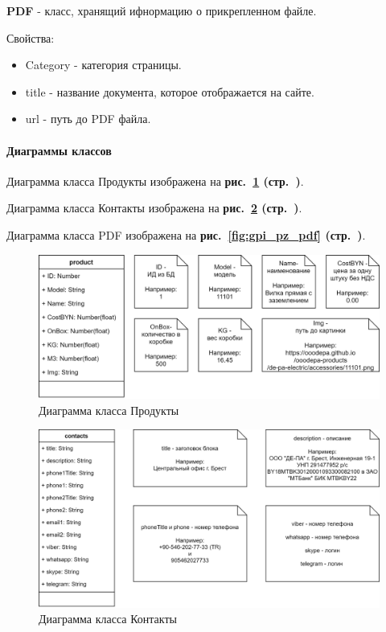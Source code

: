 \textbf{PDF} - класс, хранящий ифнормацию о прикрепленном файле.

Свойства:
\begin{itemize}
    \item Category - категория страницы.
    \item title - название документа, которое отображается на сайте.
    \item url - путь до PDF файла.
\end{itemize}

\paragraph{Диаграммы классов} \hspace{0pt}

Диаграмма класса Продукты изображена
на \textbf{рис.~\ref{fig:gpi_pz_product} (стр.~\pageref{fig:gpi_pz_product})}.

Диаграмма класса Контакты изображена
на \textbf{рис.~\ref{fig:gpi_pz_contacts} (стр.~\pageref{fig:gpi_pz_contacts})}.

Диаграмма класса PDF изображена
на \textbf{рис.~\ref{fig:gpi_pz_pdf} (стр.~\pageref{fig:gpi_pz_pdf})}.

\begin{figure}[!hb]
    \centering
    \includegraphics[width=12cm]
        {_assets/gpi_a_product.png}
    \caption{Диаграмма класса Продукты}
    \label{fig:gpi_pz_product}
\end{figure}

\begin{figure}[!hb]
    \centering
    \includegraphics[width=12cm]
        {_assets/gpi_a_contacts.png}
    \caption{Диаграмма класса Контакты}
    \label{fig:gpi_pz_contacts}
\end{figure}

